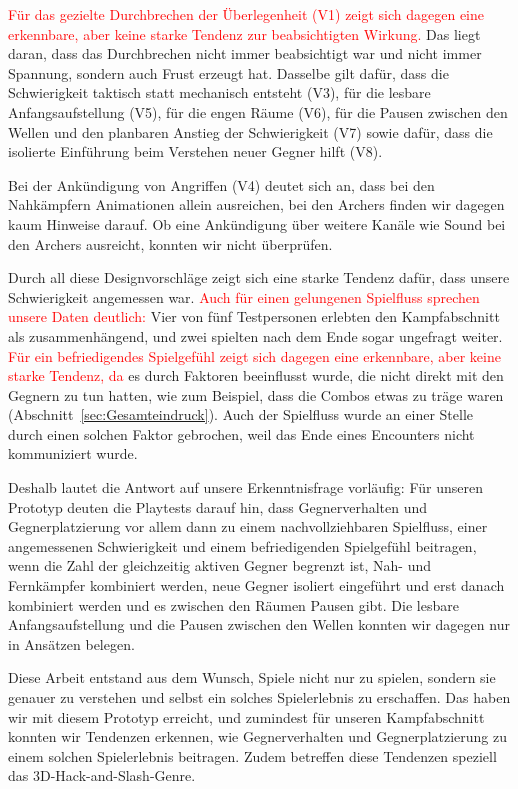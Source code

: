 \documentclass[../Main.tex]{subfiles}
\begin{document}
\textcolor{red}{Für das gezielte Durchbrechen der Überlegenheit (V1) zeigt sich dagegen eine erkennbare, aber keine starke Tendenz zur beabsichtigten Wirkung.} Das liegt daran, dass das Durchbrechen nicht immer beabsichtigt war und nicht immer Spannung, sondern auch Frust erzeugt hat. Dasselbe gilt dafür, dass die Schwierigkeit taktisch statt mechanisch entsteht (V3), für die lesbare Anfangsaufstellung (V5), für die engen Räume (V6), für die Pausen zwischen den Wellen und den planbaren Anstieg der Schwierigkeit (V7) sowie dafür, dass die isolierte Einführung beim Verstehen neuer Gegner hilft (V8).

Bei der Ankündigung von Angriffen (V4) deutet sich an, dass bei den Nahkämpfern Animationen allein ausreichen, bei den Archers finden wir dagegen kaum Hinweise darauf. Ob eine Ankündigung über weitere Kanäle wie Sound bei den Archers ausreicht, konnten wir nicht überprüfen.

Durch all diese Designvorschläge zeigt sich eine starke Tendenz dafür, dass unsere Schwierigkeit angemessen war. \textcolor{red}{Auch für einen gelungenen Spielfluss sprechen unsere Daten deutlich:} Vier von fünf Testpersonen erlebten den Kampfabschnitt als zusammenhängend, und zwei spielten nach dem Ende sogar ungefragt weiter. \textcolor{red}{Für ein befriedigendes Spielgefühl zeigt sich dagegen eine erkennbare, aber keine starke Tendenz, da} es durch Faktoren beeinflusst wurde, die nicht direkt mit den Gegnern zu tun hatten, wie zum Beispiel, dass die Combos etwas zu träge waren (Abschnitt~\ref{sec:Gesamteindruck}). Auch der Spielfluss wurde an einer Stelle durch einen solchen Faktor gebrochen, weil das Ende eines Encounters nicht kommuniziert wurde.

Deshalb lautet die Antwort auf unsere Erkenntnisfrage vorläufig: Für unseren Prototyp deuten die Playtests darauf hin, dass Gegnerverhalten und Gegnerplatzierung vor allem dann zu einem nachvollziehbaren Spielfluss, einer angemessenen Schwierigkeit und einem befriedigenden Spielgefühl beitragen, wenn die Zahl der gleichzeitig aktiven Gegner begrenzt ist, Nah- und Fernkämpfer kombiniert werden, neue Gegner isoliert eingeführt und erst danach kombiniert werden und es zwischen den Räumen Pausen gibt. Die lesbare Anfangsaufstellung und die Pausen zwischen den Wellen konnten wir dagegen nur in Ansätzen belegen.

Diese Arbeit entstand aus dem Wunsch, Spiele nicht nur zu spielen, sondern sie genauer zu verstehen und selbst ein solches Spielerlebnis zu erschaffen. Das haben wir mit diesem Prototyp erreicht, und zumindest für unseren Kampfabschnitt konnten wir Tendenzen erkennen, wie Gegnerverhalten und Gegnerplatzierung zu einem solchen Spielerlebnis beitragen. Zudem betreffen diese Tendenzen speziell das 3D-Hack-and-Slash-Genre.
\end{document}
